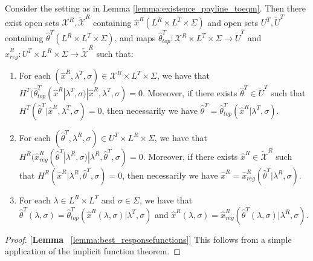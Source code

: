 \begin{lemma}\label{lemma:best_responsefunctions}
Consider the setting as in Lemma \ref{lemma:existence_payline_toeqm}. Then there exist open sets $\mathcal{X}^R, \tilde{\mathcal{X}}^R$ containing $\hat{x}^R(L^R\times L^T\times \Sigma)$ and open sets $U^T,\tilde{U}^T$ containing $\hat{\theta}^T(L^R\times L^T\times \Sigma)$, and maps $\hat{\theta}^T_{top}:\mathcal{X}^R\times L^T\times \Sigma\rightarrow \tilde{U}^T$ and $\hat{x}^R_{reg}:U^T\times L^R\times \Sigma\rightarrow \tilde{\mathcal{X}}^R$ such that:
\vspace{-5pt}
\begin{enumerate}[label=(\arabic*),ref=\thelemma(\arabic*)]
   \item For each $(\hat{x}^R,\lambda^T,\sigma)\in \mathcal{X}^R\times L^T\times \Sigma$, we have that $H^T(\hat{\theta}^T_{top}(\hat{x}^R|\lambda^T,\sigma)|\hat{x}^R,\lambda^T,\sigma)=0$. Moreover, if there exists $\hat{\theta}^T\in \tilde{U}^T$ such that $H^T(\hat{\theta}^T|\hat{x}^R,\lambda^T,\sigma) = 0$, then necessarily we have $\hat{\theta}^T = \hat{\theta}^T_{top}(\hat{x}^R|\lambda^T,\sigma)$. 
   \item For each $(\hat{\theta}^T,\lambda^R,\sigma)\in U^T\times L^R\times \Sigma$, we have that $H^R(\hat{x}^R_{reg}(\hat{\theta}^T|\lambda^R,\sigma)|\lambda^R,\hat{\theta}^T,\sigma) = 0$. Moreover, if there exists $\hat{x}^R\in \tilde{\mathcal{X}}^R$ such that $H^R(\hat{x}^R|\lambda^R,\hat{\theta}^T,\sigma) = 0$, then necessarily we have $\hat{x}^R = \hat{x}^R_{reg}(\hat{\theta}^T|\lambda^R,\sigma)$. 
   \item For each $\lambda\in L^R\times L^T$ and $\sigma\in \Sigma$, we have that $\hat{\theta}^T(\lambda,\sigma) = \hat{\theta}^T_{top}(\hat{x}^R(\lambda,\sigma)|\lambda^T,\sigma)$ and $\hat{x}^R(\lambda,\sigma) = \hat{x}^R_{reg}(\hat{\theta}^T(\lambda,\sigma)|\lambda^R,\sigma)$. 
\end{enumerate}
\end{lemma}

\begin{proof}{[\textbf{Lemma} ~\ref{lemma:best_responsefunctions}]} This follows from a simple application of the implicit function theorem. 
\end{proof}

